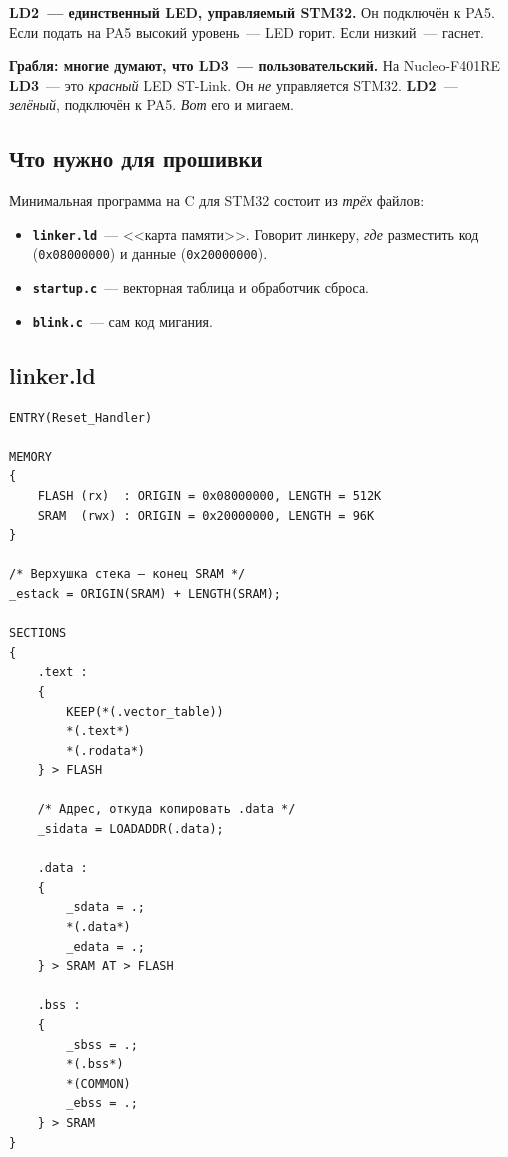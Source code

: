 \begin{keybox}
\textbf{LD2~--- единственный LED, управляемый STM32.}
Он подключён к PA5. Если подать на PA5 высокий уровень~---
LED горит. Если низкий~--- гаснет.
\end{keybox}

\begin{warnbox}
\textbf{Грабля: многие думают, что LD3~--- пользовательский.}
На Nucleo-F401RE \textbf{LD3}~--- это \emph{красный} LED
ST-Link. Он \emph{не} управляется STM32. \textbf{LD2}~---
\emph{зелёный}, подключён к PA5. \emph{Вот} его и мигаем.
\end{warnbox}

\subsection{Что нужно для прошивки}

Минимальная программа на C для STM32 состоит из \emph{трёх}
файлов:

\begin{itemize}
    \item \textbf{\texttt{linker.ld}}~--- <<карта памяти>>.
          Говорит линкеру, \emph{где} разместить код
          (\texttt{0x08000000}) и данные (\texttt{0x20000000}).
    \item \textbf{\texttt{startup.c}}~--- векторная таблица
          и обработчик сброса.
    \item \textbf{\texttt{blink.c}}~--- сам код мигания.
\end{itemize}

\subsection{linker.ld}

\begin{listing}[htbp]
\begin{verbatim}
ENTRY(Reset_Handler)

MEMORY
{
    FLASH (rx)  : ORIGIN = 0x08000000, LENGTH = 512K
    SRAM  (rwx) : ORIGIN = 0x20000000, LENGTH = 96K
}

/* Верхушка стека — конец SRAM */
_estack = ORIGIN(SRAM) + LENGTH(SRAM);

SECTIONS
{
    .text :
    {
        KEEP(*(.vector_table))
        *(.text*)
        *(.rodata*)
    } > FLASH

    /* Адрес, откуда копировать .data */
    _sidata = LOADADDR(.data);

    .data :
    {
        _sdata = .;
        *(.data*)
        _edata = .;
    } > SRAM AT > FLASH

    .bss :
    {
        _sbss = .;
        *(.bss*)
        *(COMMON)
        _ebss = .;
    } > SRAM
}
\end{verbatim}
\caption{\texttt{linker.ld}~--- карта памяти STM32F401}
\label{lst:flashing-linker}
\end{listing}

